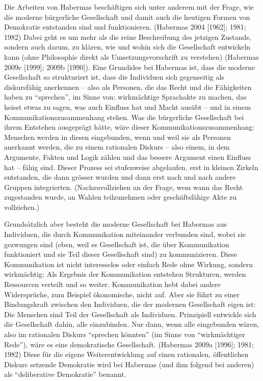 \documentclass[a4paper,
fontsize=11pt,
oneside,
numbers=noperiodatend,
parskip=half-,
bibliography=totoc,
final
]{scrartcl}
\begin{document}
Die Arbeiten von Habermas beschäftigen sich unter anderem mit der Frage,
wie die moderne bürgerliche Gesellschaft und damit auch die heutigen
Formen von Demokratie entstanden sind und funktionieren. (Habermas 2004
{[}1962{]}; 1981; 1982) Dabei geht es um mehr als die reine Beschreibung
des jetzigen Zustands, sondern auch darum, zu klären, wie und wohin sich
die Gesellschaft entwickeln kann (ohne Philosophie direkt als
Umsetzungsvorschrift zu verstehen) (Habermas 2009c {[}1999{]}; 2009b
{[}1990{]}). Eine Grundidee bei Habermas ist, dass die moderne
Gesellschaft so strukturiert ist, dass die Individuen sich gegenseitig
als diskursfähig anerkennen -- also als Personen, die das Recht und die
Fähigkeiten haben zu \enquote{sprechen}, im Sinne von: wirkmächtige
Sprachakte zu machen, das heisst etwas zu sagen, was auch Einfluss hat
und Macht ausübt -- und in einem Kommunikationszusammenhang stehen. Was
die bürgerliche Gesellschaft bei ihrem Entstehen ausgeprägt hätte, wäre
dieser Kommunikationszusammenhang: Menschen werden in diesen
eingebunden, wenn und weil sie als Personen anerkannt werden, die zu
einem rationalen Diskurs -- also einem, in dem Argumente, Fakten und
Logik zählen und das bessere Argument einen Einfluss hat -- fähig sind.
Dieser Prozess sei stufenweise abgelaufen, erst in kleinen Zirkeln
entstanden, die dann grösser wurden und dann erst nach und nach andere
Gruppen integrierten. (Nachzuvollziehen an der Frage, wem wann das Recht
zugestanden wurde, an Wahlen teilzunehmen oder geschäftsfähige Akte zu
vollziehen.)

Grundsätzlich aber besteht die moderne Gesellschaft bei Habermas aus
Individuen, die durch Kommunikation miteinander verbunden sind, wobei
sie gezwungen sind (eben, weil es Gesellschaft ist, die über
Kommunikation funktioniert und sie Teil dieser Gesellschaft sind) zu
kommunizieren. Diese Kommunikation ist nicht interesselos oder einfach
Rede ohne Wirkung, sondern wirkmächtig: Als Ergebnis der Kommunikation
entstehen Strukturen, werden Ressourcen verteilt und so weiter.
Kommunikation hebt dabei andere Widersprüche, zum Beispiel ökonomische,
nicht auf. Aber sie führt zu einer Bindungskraft zwischen den
Individuen, die der modernen Gesellschaft eigen ist: Die Menschen sind
Teil der Gesellschaft als Individuen. Prinzipiell entwickle sich die
Gesellschaft dahin, alle einzubinden. Nur dann, wenn alle eingebunden
wären, also im rationalen Diskurs \enquote{sprechen könnten} (im Sinne
von \enquote{wirkmächtiger Rede}), wäre es eine demokratische
Gesellschaft. (Habermas 2009a {[}1996{]}; 1981; 1982) Diese für die
eigene Weiterentwicklung auf einen rationalen, öffentlichen Diskurs
setzende Demokratie wird bei Habermas (und ihm folgend bei anderen) als
\enquote{deliberative Demokratie} benannt.
\end{document}
